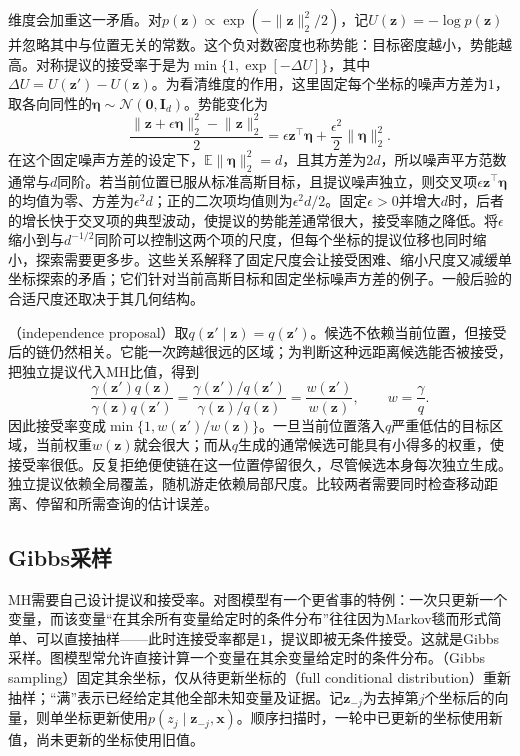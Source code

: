 维度会加重这一矛盾。对$p(\bm{z})\propto\exp(-\lVert\bm{z}\rVert_2^2/2)$，记$U(\bm{z})=-\log p(\bm{z})$并忽略其中与位置无关的常数。这个负对数密度也称势能：目标密度越小，势能越高。对称提议的接受率于是为$\min\{1,\exp[-\Delta U]\}$，其中$\Delta U=U(\bm{z}')-U(\bm{z})$。为看清维度的作用，这里固定每个坐标的噪声方差为$1$，取各向同性的$\bm{\eta}\sim\mathcal{N}(\bm 0,\bm I_d)$。势能变化为
\[
  \frac{\lVert\bm{z}+\epsilon\bm{\eta}\rVert_2^2
             -\lVert\bm{z}\rVert_2^2}{2}
    =\epsilon\bm{z}^{\top}\bm{\eta}
       +\frac{\epsilon^2}{2}\lVert\bm{\eta}\rVert_2^2.
\]
在这个固定噪声方差的设定下，$\mathbb{E}\lVert\bm{\eta}\rVert_2^2=d$，且其方差为$2d$，所以噪声平方范数通常与$d$同阶。若当前位置已服从标准高斯目标，且提议噪声独立，则交叉项$\epsilon\bm{z}^{\top}\bm{\eta}$的均值为零、方差为$\epsilon^2d$；正的二次项均值则为$\epsilon^2d/2$。固定$\epsilon>0$并增大$d$时，后者的增长快于交叉项的典型波动，使提议的势能差通常很大，接受率随之降低。将$\epsilon$缩小到与$d^{-1/2}$同阶可以控制这两个项的尺度，但每个坐标的提议位移也同时缩小，探索需要更多步。这些关系解释了固定尺度会让接受困难、缩小尺度又减缓单坐标探索的矛盾；它们针对当前高斯目标和固定坐标噪声方差的例子。一般后验的合适尺度还取决于其几何结构。

（independence proposal）取$q(\bm{z}'\mid\bm{z})=q(\bm{z}')$。候选不依赖当前位置，但接受后的链仍然相关。它能一次跨越很远的区域；为判断这种远距离候选能否被接受，把独立提议代入MH比值，得到
\[
  \frac{\gamma(\bm{z}')q(\bm{z})}
       {\gamma(\bm{z})q(\bm{z}')}
    =\frac{\gamma(\bm{z}')/q(\bm{z}')}
            {\gamma(\bm{z})/q(\bm{z})}
    =\frac{w(\bm{z}')}{w(\bm{z})},\qquad w=\frac{\gamma}{q}.
\]
因此接受率变成$\min\{1,w(\bm{z}')/w(\bm{z})\}$。一旦当前位置落入$q$严重低估的目标区域，当前权重$w(\bm{z})$就会很大；而从$q$生成的通常候选可能具有小得多的权重，使接受率很低。反复拒绝便使链在这一位置停留很久，尽管候选本身每次独立生成。独立提议依赖全局覆盖，随机游走依赖局部尺度。比较两者需要同时检查移动距离、停留和所需查询的估计误差。

\subsection{Gibbs采样}
\label{sec:pgm-sampling-gibbs}

MH需要自己设计提议和接受率。对图模型有一个更省事的特例：一次只更新一个变量，而该变量“在其余所有变量给定时的条件分布”往往因为Markov毯而形式简单、可以直接抽样——此时连接受率都是$1$，提议即被无条件接受。这就是Gibbs采样。图模型常允许直接计算一个变量在其余变量给定时的条件分布。（Gibbs sampling）固定其余坐标，仅从待更新坐标的（full conditional distribution）重新抽样；“满”表示已经给定其他全部未知变量及证据。记$\bm{z}_{-j}$为去掉第$j$个坐标后的向量，则单坐标更新使用$p(z_j\mid\bm{z}_{-j},\bm{x})$。顺序扫描时，一轮中已更新的坐标使用新值，尚未更新的坐标使用旧值。


